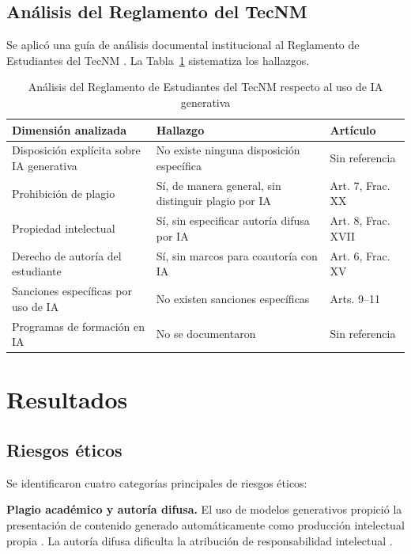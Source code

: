 \documentclass[review]{elsarticle}
\begin{document}
	\subsection{Análisis del Reglamento del TecNM}
	
	Se aplicó una guía de análisis documental institucional al Reglamento de Estudiantes del TecNM \citep{tecnm2023}. La Tabla~\ref{tab:reganalisis} sistematiza los hallazgos.
	
	\begin{table}[H]
		\centering
		\caption{Análisis del Reglamento de Estudiantes del TecNM respecto al uso de IA generativa}
		\label{tab:reganalisis}
		\begin{tabularx}{\textwidth}{p{3.5cm} X p{2.5cm}}
			\toprule
			\textbf{Dimensión analizada} & \textbf{Hallazgo} & \textbf{Artículo} \\
			\midrule
			Disposición explícita sobre IA generativa & No existe ninguna disposición específica & Sin referencia \\
			\midrule
			Prohibición de plagio & Sí, de manera general, sin distinguir plagio por IA & Art. 7, Frac. XX \\
			\midrule
			Propiedad intelectual & Sí, sin especificar autoría difusa por IA & Art. 8, Frac. XVII \\
			\midrule
			Derecho de autoría del estudiante & Sí, sin marcos para coautoría con IA & Art. 6, Frac. XV \\
			\midrule
			Sanciones específicas por uso de IA & No existen sanciones específicas & Arts. 9--11 \\
			\midrule
			Programas de formación en IA & No se documentaron & Sin referencia \\
			\bottomrule
		\end{tabularx}
	\end{table}
	
	\section{Resultados}
	
	\subsection{Riesgos éticos}
	
	Se identificaron cuatro categorías principales de riesgos éticos:
	
	\textbf{Plagio académico y autoría difusa.} El uso de modelos generativos propició la presentación de contenido generado automáticamente como producción intelectual propia \citep{gallenttorres2023}. La autoría difusa dificulta la atribución de responsabilidad intelectual \citep{gallenttorres2023, lim2024}.
	
\end{document}
